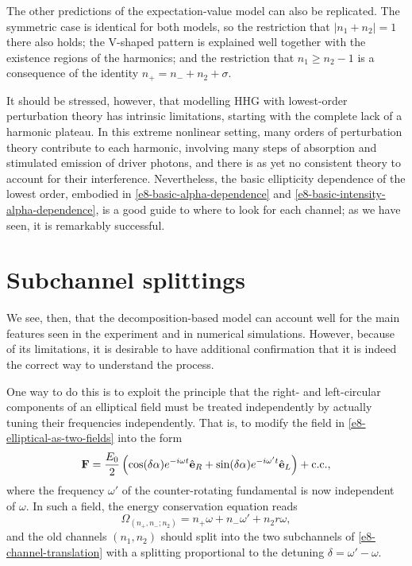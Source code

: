 The other predictions of the expectation-value model can also be replicated. The symmetric case is identical for both models, so the restriction that $|n_1+n_2|=1$ there also holds; the V-shaped pattern is explained well together with the existence regions of the harmonics; and the restriction that $n_1\geq n_2-1$ is a consequence of the identity $n_+=n_- + n_2 + \sigma$.

It should be stressed, however, that modelling HHG with lowest-order perturbation theory has intrinsic limitations, starting with the complete lack of a harmonic plateau. In this extreme nonlinear setting, many orders of perturbation theory contribute to each harmonic, involving many steps of absorption and stimulated emission of driver photons, and there is as yet no consistent theory to account for their interference. Nevertheless, the basic ellipticity dependence of the lowest order, embodied in \eqref{e8-basic-alpha-dependence} and \eqref{e8-basic-intensity-alpha-dependence}, is a good guide to where to look for each channel; as we have seen, it is remarkably successful.














\section{Subchannel splittings}
\label{sec:subchannel-splittings}
We see, then, that the decomposition-based model can account well for the main features seen in the experiment and in numerical simulations. However, because of its limitations, it is desirable to have additional confirmation that it is indeed the correct way to understand the process.

One way to do this is to exploit the principle that the right- and left-circular components of an elliptical field must be treated independently by actually tuning their frequencies independently. That is, to modify the field in \eqref{e8-elliptical-as-two-fields} into the form
\begin{equation}
 \vb{F}=
 \frac{E_0}{2}
 \left(
 \cos(\delta\alpha)e^{-i\omega t}\hat{\vb{e}}_R
 +
  \sin(\delta\alpha)e^{-i\omega' t}\hat{\vb{e}}_L
 \right)
 +\mathrm{c.c.},
 \label{e8-detuned-elliptical-field}
\end{equation}
where the frequency $\omega'$ of the counter-rotating fundamental is now independent of $\omega$. In such a field, the energy conservation equation reads
\begin{equation}
 \Omega_{(n_+,n_-;n_2)}=n_+\omega + n_-\omega'+n_2r\omega,
 \label{e8-modified-energy-conservation}
\end{equation}
and the old channels $(n_1,n_2)$ should split into the two subchannels of \eqref{e8-channel-translation} with a splitting proportional to the detuning $\delta=\omega'-\omega$.









